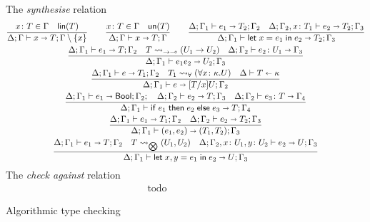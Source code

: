 \begin{figure}[h!]
The \emph{synthesise} relation\hfill{}
\begin{gather*}
  \frac{
    x\colon T \in \varEnv
    \quad
    \linp T
  }{
    \algtypeout x T {\varEnv\setminus\{x\}}
  }
  \qquad
  \frac{
    x\colon T \in \varEnv
    \quad
    \unp T
  }{
    \algtypeout x T \varEnv
  }
  \qquad
  \frac{
    \algtypeout[\kindEnv;\varEnv_1]{e_1}{T_2}{\varEnv_2}
    \quad
    \algtypeout[\kindEnv;\varEnv_2,x\colon T_1]{e_2}{T_2}{\Gamma_3}
  }{
    \algtypeout[\kindEnv;\varEnv_1]{\unlete{x}{e_1}{e_2}}{T_2}{\varEnv_3}
  }
  \\
  \frac{
    \algtypeout[\kindEnv;\varEnv_1]{e_1}{T}{\varEnv_2}
    \quad
    T \Extract{\rightarrow\multimap} (U_1\rightarrow U_2)
    \quad
    \algtypein[\kindEnv;\varEnv_2]{e_2}{U_1}{\varEnv_3}
  }{
    \algtypeout[\kindEnv;\varEnv_1]{e_1e_2}{U_2}{\varEnv_3}
  }
  \\
  \frac{
    \algtypeout[\kindEnv;\varEnv_1]{e}{T_1}{\varEnv_2}
    \quad
    T_1 \Extract{\forall} (\forall x\colon\kind.U)
    \quad
    \algkindin T \kind
  }{
    \algtypeout[\kindEnv;\varEnv_1]{e}{\subs T x U}{\varEnv_2}
  }
  \\
  \frac{
    \algtypeout[\kindEnv;\varEnv_1]{e_1}{\boole;\varEnv_2}
    \quad
    \algtypeout[\kindEnv;\varEnv_2]{e_2}{T}{\varEnv_3}
    \quad
    \algtypein[\kindEnv;\varEnv_2]{e_3}{T}{\varEnv_4}
  }{
    \algtypeout[\kindEnv;\varEnv_1]{\conditionale{e_1}{e_2}{e_3}}{T}{\varEnv_4}
  }
  \\
  \frac{
    \algtypeout[\kindEnv ; \varEnv_1]{e_1}{T_1}{\varEnv_2}
    \quad
    \algtypeout[\kindEnv ; \varEnv_2]{e_2}{T_2}{\varEnv_3}
  }{
    \algtypeout[\kindEnv ; \varEnv_1]{(e_1, e_2)}{(T_1,T_2)}{\varEnv_3}
  }
  \\
  \frac{
    \algtypeout[\kindEnv ; \varEnv_1]{e_1}{T}{\varEnv_2}
    \quad
    T \Extract{\bigotimes} (U_1, U_2)
    \quad
    \algtypeout[\kindEnv; \varEnv_2, x\colon U_1, y\colon U_2]{e_2}{U}{\varEnv_3}
  }{
    \algtypeout[\kindEnv;
    \varEnv_1]{\binlete{x}{y}{e_1}{e_2}}{U}{\varEnv_3}
  }
\end{gather*}
% 
% 
The \emph{check against} relation\hfill{}
\begin{gather*}
  \text{todo}
\end{gather*}
\caption{Algorithmic type checking}
\label{fig:alg-typing}
\end{figure}

